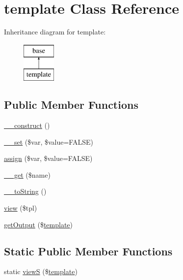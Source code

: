 \hypertarget{classtemplate}{
\section{template Class Reference}
\label{classtemplate}
}
Inheritance diagram for template:\begin{figure}[H]
\begin{center}
\leavevmode
\includegraphics[height=2.000000cm]{classtemplate}
\end{center}
\end{figure}
\subsection*{Public Member Functions}
\begin{DoxyCompactItemize}
\item 
\hyperlink{classtemplate_a095c5d389db211932136b53f25f39685}{\_\-\_\-construct} ()
\item 
\hyperlink{classtemplate_a8ba8e88dc2035039ed49e5d7a9c43093}{\_\-\_\-set} (\$var, \$value=FALSE)
\item 
\hyperlink{classtemplate_aad89b99f86fc0d4fd6a0d0f3f7a15867}{assign} (\$var, \$value=FALSE)
\item 
\hyperlink{classtemplate_abc8e9e31bb15c8a44c3210ec551407c8}{\_\-\_\-get} (\$name)
\item 
\hyperlink{classtemplate_a7516ca30af0db3cdbf9a7739b48ce91d}{\_\-\_\-toString} ()
\item 
\hyperlink{classtemplate_ada2685086f0dc2eb8099c94f7d074885}{view} (\$tpl)
\item 
\hyperlink{classtemplate_abcdc5267dc378cabc6d0d5de589b358b}{getOutput} (\$\hyperlink{classtemplate}{template})
\end{DoxyCompactItemize}
\subsection*{Static Public Member Functions}
\begin{DoxyCompactItemize}
\item 
static \hyperlink{classtemplate_a177589d5a40b626113b51f2e2b1a7eb5}{viewS} (\$\hyperlink{classtemplate}{template})
\end{DoxyCompactItemize}


